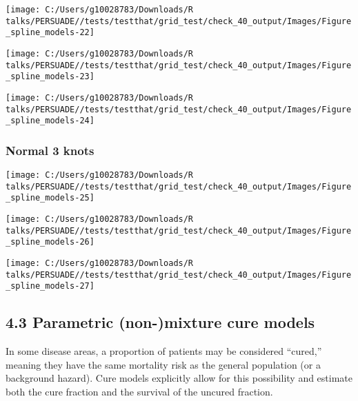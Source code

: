 \documentclass[
]{article}
\begin{document}
\begin{flushleft}\texttt{[image: C:/Users/g10028783/Downloads/R talks/PERSUADE//tests/testthat/grid\_test/check\_40\_output/Images/Figure\_spline\_models-22]} \end{flushleft}

\begin{flushleft}\texttt{[image: C:/Users/g10028783/Downloads/R talks/PERSUADE//tests/testthat/grid\_test/check\_40\_output/Images/Figure\_spline\_models-23]} \end{flushleft}

\begin{flushleft}\texttt{[image: C:/Users/g10028783/Downloads/R talks/PERSUADE//tests/testthat/grid\_test/check\_40\_output/Images/Figure\_spline\_models-24]} \end{flushleft}

\clearpage

\subsubsection{Normal 3 knots}\label{normal-3-knots}

\begin{flushleft}\texttt{[image: C:/Users/g10028783/Downloads/R talks/PERSUADE//tests/testthat/grid\_test/check\_40\_output/Images/Figure\_spline\_models-25]} \end{flushleft}

\begin{flushleft}\texttt{[image: C:/Users/g10028783/Downloads/R talks/PERSUADE//tests/testthat/grid\_test/check\_40\_output/Images/Figure\_spline\_models-26]} \end{flushleft}

\begin{flushleft}\texttt{[image: C:/Users/g10028783/Downloads/R talks/PERSUADE//tests/testthat/grid\_test/check\_40\_output/Images/Figure\_spline\_models-27]} \end{flushleft}

\clearpage

\subsection{4.3 Parametric (non-)mixture cure
models}\label{parametric-non-mixture-cure-models}

In some disease areas, a proportion of patients may be considered
``cured,'' meaning they have the same mortality risk as the general
population (or a background hazard). Cure models explicitly allow for
this possibility and estimate both the cure fraction and the survival of
the uncured fraction.
\end{document}
